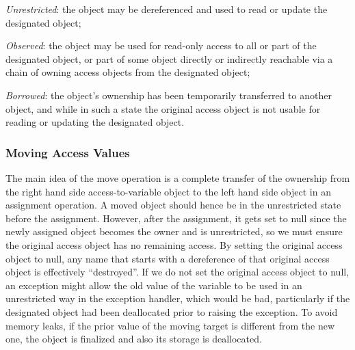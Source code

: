 \documentclass{llncs}
\begin{document}
\begin{compactitem} 
  \item \textit {Unrestricted}: the object may be dereferenced and used to read or update the designated object;
  \item \textit {Observed}: the object may be used for read-only access to all or part of the designated object, or part of some object directly or indirectly reachable via a chain of owning access objects from the designated object;
  \item \textit {Borrowed}: the object's ownership has been temporarily transferred to another object,  and while in such a state the original access object is not usable for reading or updating the designated object.
\end{compactitem}


\subsubsection{Moving Access Values}
\label{sec:moving}

The main idea of the move operation is a complete transfer of the ownership from the right hand side access-to-variable object to the left hand side object in an assignment operation.
A moved object should hence be in the unrestricted state before the assignment. However, after the assignment, it gets set to null since the newly assigned object becomes the owner
and is unrestricted, so we must ensure the original access object has no remaining access.  By setting the original access object to null, any name that starts with a dereference of
that original access object is effectively ``destroyed''. If we do not set the original access object to null, an exception might allow the old value of the variable to be used in
an unrestricted way in the exception handler, which would be bad, particularly if the designated object had been deallocated prior to raising the exception. To avoid memory leaks,
if the prior value of the moving target is different from the new one, the object is finalized and also its storage is deallocated.  
\end{document}
